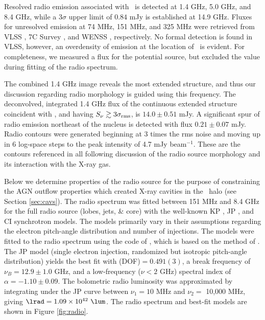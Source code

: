 \documentclass[useAMS,usenatbib]{mn2e}
\begin{document}
Resolved radio emission associated with \irs\ is detected at 1.4 GHz,
5.0 GHz, and 8.4 GHz, while a $3\sigma$ upper limit of $0.84$ mJy is
established at 14.9 GHz. Fluxes for unresolved emission at 74 MHz, 151
MHz, and 325 MHz were retrieved from VLSS \citep{vlss}, 7C Survey
\citep{1999MNRAS.306...31R}, and WENSS \citep{1997A&AS..124..259R},
respectively. No formal detection is found in VLSS, however, an
overdensity of emission at the location of \irs\ is evident. For
completeness, we measured a flux for the potential source, but
excluded the value during fitting of the radio spectrum.

The combined 1.4 GHz image reveals the most extended structure, and
thus our discussion regarding radio morphology is guided using this
frequency. The deconvolved, integrated 1.4 GHz flux of the continuous
extended structure coincident with \irs, and having $S_{\nu} \gtrsim
3\sigma_{\mathrm{rms}}$, is $14.0 \pm 0.51$ mJy. A significant spur of
radio emission northeast of the nucleus is detected with flux $0.21
\pm 0.07$ mJy. Radio contours were generated beginning at 3 times the
rms noise and moving up in 6 log-space steps to the peak intensity of
4.7 mJy beam$^{-1}$. These are the contours referenced in all
following discussion of the radio source morphology and its
interaction with the X-ray gas.

Below we determine properties of the radio source for the purpose of
constraining the AGN outflow properties which created X-ray cavities
in the \rxj\ halo (see Section \ref{sec:cavs}). The radio spectrum was
fitted between 151 MHz and 8.4 GHz for the full radio source (lobes,
jets, \& core) with the well-known KP \citep{1962SvA.....6..317K,
  pach}, JP \citep{1973A&A....26..423J}, and CI
\citep{1987MNRAS.225..335H} synchrotron models. The models primarily
vary in their assumptions regarding the electron pitch-angle
distribution and number of injections. The models were fitted to the
radio spectrum using the code of \citet{2005ApJ...624..656W}, which is
based on the method of \citet{1991ApJ...383..554C}. The JP model
(single electron injection, randomized but isotropic pitch-angle
distribution) yields the best fit with \chisq(DOF)$ = 0.491(3)$, a
break frequency of $\nu_B = 12.9 \pm 1.0$ GHz, and a low-frequency
($\nu < 2$ GHz) spectral index of $\alpha = -1.10 \pm 0.09$. The
bolometric radio luminosity was approximated by integrating under the
JP curve between $\nu_1 = 10$ MHz and $\nu_2 =$ 10,000 MHz, giving
$\lrad = 1.09 \times 10^{42}~\lum$. The radio spectrum and best-fit
models are shown in Figure \ref{fig:radio}.
\end{document}
